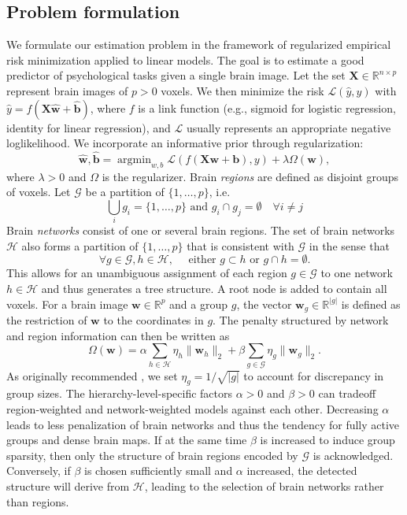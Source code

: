 \documentclass[runningheads,a4paper]{llncs}
\DeclareMathOperator{\argmin}{argmin}
\begin{document}
\subsection{Problem formulation}
We formulate our estimation problem in the framework of regularized
empirical risk
minimization applied to linear models.
The goal is to estimate a good predictor of psychological tasks
given a single brain image. Let the set
\(\mathbf{X}\in\mathbb{R}^{n \times p}\) represent brain
images of \(p > 0\) voxels.
We then minimize the risk \(\mathcal L(\hat y, y)\) with
\(\hat y = f(\mathbf{X} \mathbf{\hat w} + \mathbf{\hat b})\), where \(f\) is a link function 
(e.g., sigmoid for logistic regression, identity for linear regression),
and \(\mathcal L\) usually represents an appropriate negative loglikelihood.
We incorporate an informative prior through regularization:
\[ \mathbf{\hat{w}, \hat{b}} = \argmin_{w, b} \mathcal L(f(\mathbf{X}\mathbf{w} + \mathbf{b}), y) + \lambda\Omega(\mathbf{w}),\]
where \(\lambda > 0\) and \(\Omega\) is the regularizer.
Brain \textit{regions} are defined as disjoint groups of voxels. Let \(\mathcal G\)
be a partition of \(\{1, \dots, p\}\), i.e.
\[  \bigcup_{i} g_i = \{1, \dots, p\} \textrm{ and } g_i\cap g_j=\emptyset
\quad\forall i\not=j\]
Brain \textit{networks} consist of one or several brain regions.
The set of brain networks \(\mathcal{H}\) also forms a partition of 
\(\{1, \dots, p\}\) that is consistent with \(\mathcal G\) in
the sense that
\[\forall g\in\mathcal G, h\in\mathcal H,\quad
\textrm{ either } g\subset h\textrm{ or }g\cap h = \emptyset.\]
This allows for an unambiguous assignment of each region \(g\in\mathcal G\) to one
network \(h\in\mathcal H\) and thus generates a tree structure.
A root node is added to contain all voxels.
For a brain image \(\mathbf{w}\in\mathbb{R}^p\) and a group \(g\), the vector 
\(\mathbf{w}_g\in\mathbb{R}^{|g|}\) is defined as the restriction of \(\mathbf{w}\) to the coordinates
 in \(g\). The penalty structured by network
and region information can then be written as
\[\Omega(\mathbf{w}) = \alpha\sum_{h\in\mathcal H}\eta_h\|\mathbf{w}_h\|_2 + \beta\sum_{g\in\mathcal G}\eta_g\|\mathbf{w}_g\|_2.\]
As originally recommended \cite{yuan2006model},
we set \(\eta_g = 1/\sqrt{|g|}\) to
account for discrepancy in group sizes. The hierarchy-level-specific factors 
\(\alpha > 0\) and \(\beta > 0\) can tradeoff region-weighted and
network-weighted models against each other.
Decreasing \(\alpha\) leads to less 
penalization of brain networks and thus the tendency for fully active groups
and dense brain maps. If at the same time \(\beta\) is increased to 
induce group sparsity, then only the structure of brain regions encoded
by \(\mathcal G\) is acknowledged. Conversely, if \(\beta\) is chosen 
sufficiently small and \(\alpha\) increased,
the detected structure will derive from \(\mathcal H\), leading to the
selection of brain networks rather than regions.
\end{document}
